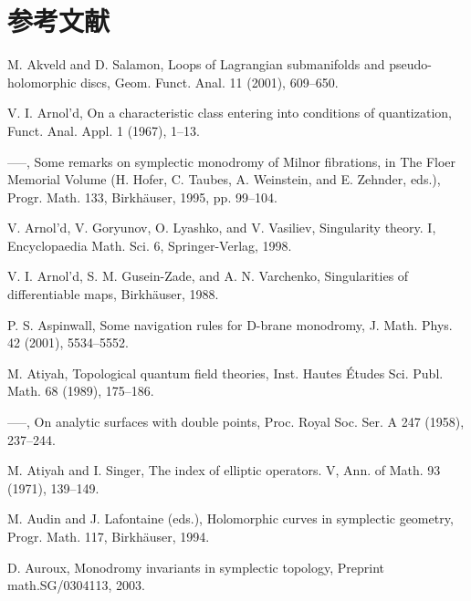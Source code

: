 \chapter*{参考文献}
\begin{list}{}{\setlength{\leftmargin}{3em}\setlength{\labelwidth}{2.5em}\setlength{\itemsep}{.5em}\small}
\item[\hypertarget{bib:1}{[1]}] M. Akveld and D. Salamon, Loops of Lagrangian submanifolds and pseudo-holomorphic discs, Geom. Funct. Anal. 11 (2001), 609–650. 
\item[\hypertarget{bib:2}{[2]}] V. I. Arnol'd, On a characteristic class entering into conditions of quantization, Funct. Anal. Appl. 1 (1967), 1–13. 
\item[\hypertarget{bib:3}{[3]}] —–, Some remarks on symplectic monodromy of Milnor fibrations, in The Floer Memorial Volume (H. Hofer, C. Taubes, A. Weinstein, and E. Zehnder, eds.), Progr. Math. 133, Birkhäuser, 1995, pp. 99–104. 
\item[\hypertarget{bib:4}{[4]}] V. Arnol'd, V. Goryunov, O. Lyashko, and V. Vasiliev, Singularity theory. I, Encyclopaedia Math. Sci. 6, Springer-Verlag, 1998. 
\item[\hypertarget{bib:5}{[5]}] V. I. Arnol'd, S. M. Gusein-Zade, and A. N. Varchenko, Singularities of differentiable maps, Birkhäuser, 1988. 
\item[\hypertarget{bib:6}{[6]}] P. S. Aspinwall, Some navigation rules for D-brane monodromy, J. Math. Phys. 42 (2001), 5534–5552. 
\item[\hypertarget{bib:7}{[7]}] M. Atiyah, Topological quantum field theories, Inst. Hautes Études Sci. Publ. Math. 68 (1989), 175–186. 
\item[\hypertarget{bib:8}{[8]}] —–, On analytic surfaces with double points, Proc. Royal Soc. Ser. A 247 (1958), 237–244. 
\item[\hypertarget{bib:9}{[9]}] M. Atiyah and I. Singer, The index of elliptic operators. V, Ann. of Math. 93 (1971), 139–149. 
\item[\hypertarget{bib:10}{[10]}] M. Audin and J. Lafontaine (eds.), Holomorphic curves in symplectic geometry, Progr. Math. 117, Birkhäuser, 1994. 
\item[\hypertarget{bib:11}{[11]}] D. Auroux, Monodromy invariants in symplectic topology, Preprint math.SG/0304113, 2003. 

\end{list}
